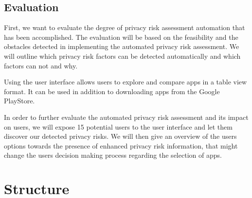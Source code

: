 \documentclass[
	a4paper,
	oneside,
	12pt,
	liststotocnumbered
]{article}
\let\cite\textcite
\begin{document}
\subsection{Evaluation}

First, we want to evaluate the degree of privacy risk assessment automation that has been accomplished. 
The evaluation will be based on the feasibility and the obstacles detected in implementing the automated privacy risk assessment. We will outline which privacy risk factors can be detected automatically and which factors can not and why.

Using the \cite{Bruggemann2016} user interface allows users to explore and compare \mH apps in a table view format. 
It can be used in addition to downloading apps from the Google PlayStore.

In order to further evaluate the automated privacy risk assessment and its impact on users, we will expose 15 potential users to the user interface and let them discover our detected privacy risks.
We will then give an overview of the users options towards the presence of enhanced privacy risk information, that might change the users decision making process regarding the selection of \mH apps.

\section{Structure}
\end{document}
